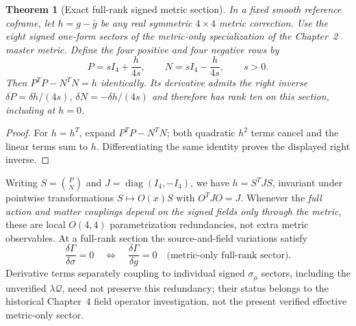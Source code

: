 \documentclass[11pt,a4paper]{article}
\newtheorem{theorem}{Theorem}[section]
\theoremstyle{remark}
\begin{document}
\begin{theorem}[Exact full-rank signed metric section]\label{thm:signed}
In a fixed smooth reference coframe, let
$h=g-\bar g$ be any real symmetric $4\times4$ metric correction.
Use the eight signed one-form sectors of the metric-only specialization
of the Chapter~2 master metric. Define the four positive and four
negative rows by
\begin{equation}\label{eq:PN}
\boxed{P=sI_4+\frac{h}{4s},\qquad
N=sI_4-\frac{h}{4s},\qquad s>0.}
\end{equation}
Then $P^TP-N^TN=h$ identically. Its derivative admits the right inverse
$\delta P=\delta h/(4s)$, $\delta N=-\delta h/(4s)$ and therefore has
rank ten on this section, including at $h=0$.
\end{theorem}
\begin{proof}
For $h=h^T$, expand $P^TP-N^TN$; both quadratic $h^2$ terms
cancel and the linear terms sum to $h$. Differentiating the same
identity proves the displayed right inverse.\end{proof}
Writing $S=\binom PN$ and $J=\operatorname{diag}(I_4,-I_4)$,
we have $h=S^TJS$, invariant under pointwise transformations
$S\mapsto O(x)S$ with $O^TJO=J$. Whenever the \emph{full action and
matter couplings depend on the signed fields only through the metric},
these are local $O(4,4)$ parametrization redundancies, not extra
metric observables. At a full-rank section the source-and-field
variations satisfy
\begin{equation}\label{eq:ELsigned}
\boxed{\frac{\delta\Gamma}{\delta\sigma}=0
\quad\Longleftrightarrow\quad
\frac{\delta\Gamma}{\delta g}=0\quad
\text{(metric-only full-rank sector)}.}
\end{equation}
Derivative terms separately coupling to individual signed $\sigma_\mu$ sectors,
including the unverified $\lambda\mathcal Q$, need not preserve this
redundancy; their status belongs to the historical Chapter~4 field
operator investigation, not the present verified effective metric-only
sector.
\end{document}
